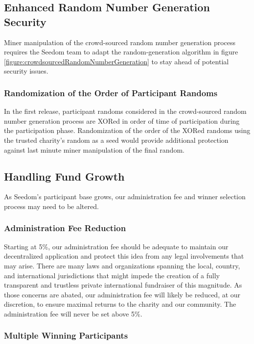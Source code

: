 \documentclass[11pt]{article}
\begin{document}
\subsection{Enhanced Random Number Generation Security}

Miner manipulation of the crowd-sourced random number generation process requires the Seedom team to adapt the random-generation algorithm in figure \ref{figure:crowdsourcedRandomNumberGeneration} to stay ahead of potential security issues.

\subsubsection{Randomization of the Order of Participant Randoms}

In the first release, participant randoms considered in the crowd-sourced random number generation process are XORed in order of time of participation during the participation phase. Randomization of the order of the XORed randoms using the trusted charity's random as a seed would provide additional protection against last minute miner manipulation of the final random.

\subsection{Handling Fund Growth}

As Seedom's participant base grows, our administration fee and winner selection process may need to be altered.

\subsubsection{Administration Fee Reduction}

Starting at 5\%, our administration fee should be adequate to maintain our decentralized application and protect this idea from any legal involvements that may arise. There are many laws and organizations spanning the local, country, and international jurisdictions that might impede the creation of a fully transparent and trustless private international fundraiser of this magnitude. As those concerns are abated, our administration fee will likely be reduced, at our discretion, to ensure maximal returns to the charity and our community. The administration fee will never be set above 5\%.

\subsubsection{Multiple Winning Participants}
\end{document}
